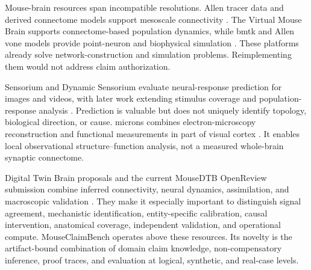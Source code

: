 Mouse-brain resources span incompatible resolutions. Allen tracer data and derived connectome models support mesoscale connectivity \citep{oh2014mesoscale,knox2019connectome}. The Virtual Mouse Brain supports connectome-based population dynamics, while \ac{bmtk} and Allen \ac{vone} models provide point-neuron and biophysical simulation \citep{melozzi2017virtualmouse,dai2020bmtk,billeh2020v1}. These platforms already solve network-construction and simulation problems. Reimplementing them would not address claim authorization.

Sensorium and Dynamic Sensorium evaluate neural-response prediction for images and videos, with later work extending stimulus coverage and population-response analysis \citep{willeke2022sensorium,turishcheva2023dynamic,turishcheva2024retrospective,wang2025foundation,liscai2025population}. Prediction is valuable but does not uniquely identify topology, biological direction, or cause. \ac{microns} combines electron-microscopy reconstruction and functional measurements in part of visual cortex \citep{bae2025microns,ding2025wiring}. It enables local observational structure--function analysis, not a measured whole-brain synaptic connectome.

Digital Twin Brain proposals and the current MouseDTB OpenReview submission combine inferred connectivity, neural dynamics, assimilation, and macroscopic validation \citep{xiong2023dtb,chen2026mousedtb}. They make it especially important to distinguish signal agreement, mechanistic identification, entity-specific calibration, causal intervention, anatomical coverage, independent validation, and operational compute. MouseClaimBench operates above these resources. Its novelty is the artifact-bound combination of domain claim knowledge, non-compensatory inference, proof traces, and evaluation at logical, synthetic, and real-case levels.
